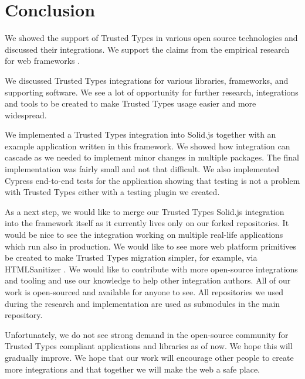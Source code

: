\chapter{Conclusion}


We showed the support of Trusted Types in various open source technologies and discussed their
integrations. We support the claims from the empirical research for web frameworks
\cite{tt_web_framework_paper}.

We discussed Trusted Types integrations for various libraries, frameworks, and supporting software.
We see a lot of opportunity for further research, integrations and tools to be created to make
Trusted Types usage easier and more widespread.

We implemented a Trusted Types integration into Solid.js together with an example application
written in this framework. We showed how integration can cascade as we needed to implement minor
changes in multiple packages. The final implementation was fairly small and not that difficult. We
also implemented Cypress end-to-end tests for the application showing that testing is not a problem
with Trusted Types either with a testing plugin we created.

As a next step, we would like to merge our Trusted Types Solid.js integration into the framework
itself as it currently lives only on our forked repositories. It would be nice to see the
integration working on multiple real-life applications which run also in production. We would like
to see more web platform primitives be created to make Trusted Types migration simpler, for example,
via HTMLSanitizer \cite{tt_report_mid2021}. We would like to contribute with more open-source
integrations and tooling and use our knowledge to help other integration authors. All of our work is
open-sourced and available for anyone to see. All repositories we used during the research and
implementation are used as submodules in the main repository.

Unfortunately, we do not see strong demand in the open-source community for Trusted Types
compliant applications and libraries as of now. We hope this will gradually improve. We hope that
our work will encourage other people to create more integrations and that together we will make the
web a safe place.
